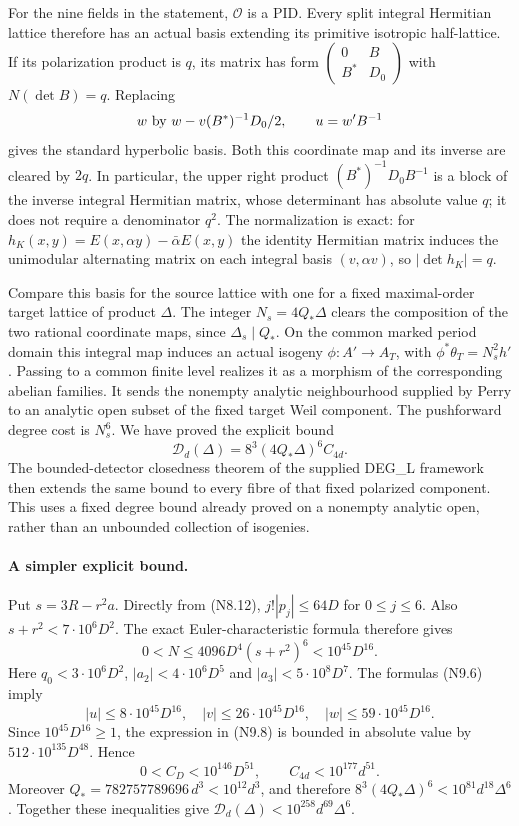 For the nine fields in the statement, $\mathcal O$ is a PID.
Every split integral Hermitian lattice therefore has an actual
basis extending its primitive isotropic half-lattice. If its
polarization product is $q$, its matrix has form
$\left(\begin{smallmatrix}0&B\\B^*&D_0\end{smallmatrix}\right)$
with $N(\det B)=q$. Replacing
\[
 w\ \hbox{by}\ w-v(B^*)^{-1}D_0/2,\qquad
 u=w'B^{-1}
\]
gives the standard hyperbolic basis. Both this coordinate map
and its inverse are cleared by $2q$. In particular, the upper
right product $(B^*)^{-1}D_0B^{-1}$ is a block of the inverse
integral Hermitian matrix, whose determinant has absolute value
$q$; it does not require a denominator $q^2$.
The normalization is exact: for
$h_K(x,y)=E(x,\alpha y)-\bar\alpha E(x,y)$ the identity
Hermitian matrix induces the unimodular alternating matrix on
each integral basis $(v,\alpha v)$, so $|\det h_K|=q$.

Compare this basis for the source lattice with one for a fixed
maximal-order target lattice of product $\Delta$. The integer
$N_s=4Q_*\Delta$ clears the composition of the two rational
coordinate maps, since $\Delta_s\mid Q_*$. On the common
marked period domain this integral map induces an actual
isogeny $\phi:A'\to A_T$, with
$\phi^*\theta_T=N_s^2h'$. Passing to a common finite level
realizes it as a morphism of the corresponding abelian families.
It sends the nonempty analytic neighbourhood supplied by Perry
to an analytic open subset of the fixed target Weil component.
The pushforward degree cost is $N_s^6$. We have proved the
explicit bound
\[
 \boxed{\mathcal D_d(\Delta)=
       8^3(4Q_*\Delta)^6 C_{4d}.}                        \tag{N9.9}
\]
The bounded-detector closedness theorem of the supplied DEG\_L
framework then extends the same bound to every fibre of that
fixed polarized component. This uses a fixed degree bound
already proved on a nonempty analytic open, rather than an
unbounded collection of isogenies.

\paragraph{A simpler explicit bound.}
Put $s=3R-r^2a$. Directly from (N8.12),
$j!|p_j|\le64D$ for $0\le j\le6$. Also
$s+r^2<7\cdot10^6D^2$. The exact Euler-characteristic formula
therefore gives
\[
 0<N\le4096D^4(s+r^2)^6
       <10^{45}D^{16}.
\]
Here $q_0<3\cdot10^6D^2$,
$|a_2|<4\cdot10^6D^5$ and $|a_3|<5\cdot10^8D^7$.
The formulas (N9.6) imply
\[
 |u|\le8\cdot10^{45}D^{16},\quad
 |v|\le26\cdot10^{45}D^{16},\quad
 |w|\le59\cdot10^{45}D^{16}.
\]
Since $10^{45}D^{16}\ge1$, the expression in (N9.8) is bounded
in absolute value by $512\cdot10^{135}D^{48}$. Hence
\[
 0<C_D<10^{146}D^{51},\qquad C_{4d}<10^{177}d^{51}.
\]
Moreover
$Q_*=782757789696\,d^3<10^{12}d^3$, and therefore
$8^3(4Q_*\Delta)^6<10^{81}d^{18}\Delta^6$.
Together these inequalities give
$\mathcal D_d(\Delta)<10^{258}d^{69}\Delta^6$.

